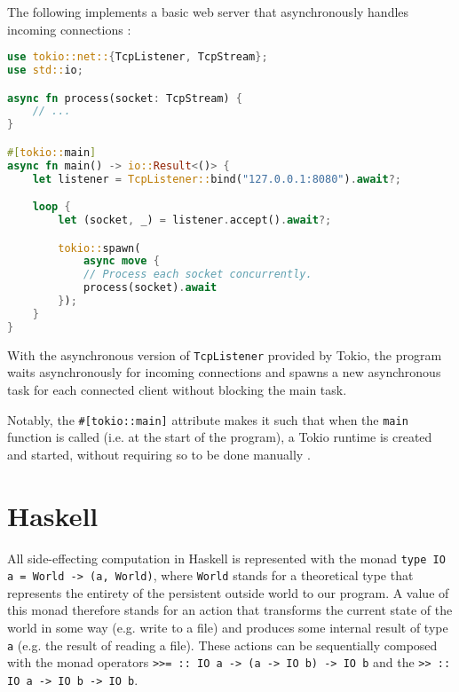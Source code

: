\documentclass[a4paper,UKenglish,cleveref, autoref, thm-restate]{lipics-v2021}
\begin{document}
The following implements a basic web server that asynchronously handles incoming connections \cite{spawnint88:online}:

\begin{minipage}{\linewidth}
\begin{lstlisting}[language=Rust,caption={A basic async webserver},captionpos=t]
use tokio::net::{TcpListener, TcpStream};
use std::io;

async fn process(socket: TcpStream) {
    // ...
}

#[tokio::main]
async fn main() -> io::Result<()> {
    let listener = TcpListener::bind("127.0.0.1:8080").await?;

    loop {
        let (socket, _) = listener.accept().await?;

        tokio::spawn(
            async move {
            // Process each socket concurrently.
            process(socket).await
        });
    }
}
\end{lstlisting}
\end{minipage}

With the asynchronous version of \lstinline{TcpListener} provided by Tokio, the program waits asynchronously for incoming connections and spawns a new asynchronous task for each connected client without blocking the main task.

Notably, the \lstinline{#[tokio::main]} attribute makes it such that when the \lstinline{main} function is called (i.e. at the start of the program), a Tokio runtime is created and started, without requiring so to be done manually \cite{maininto61:online}.

\section{Haskell}
\label{sec:haskell}

All side-effecting computation in Haskell is represented with the monad \newline\lstinline{type IO a = World -> (a, World)}, where \lstinline{World} stands for a theoretical type that represents the entirety of the persistent outside world to our program\cite{jones2001monadic}. A value of this monad therefore stands for an action that transforms the current state of the world in some way (e.g. write to a file) and produces some internal result of type \lstinline{a} (e.g. the result of reading a file). These actions can be sequentially composed with the monad operators \lstinline{>>= :: IO a -> (a -> IO b) -> IO b} and the \lstinline{>> :: IO a -> IO b -> IO b}.
\end{document}
